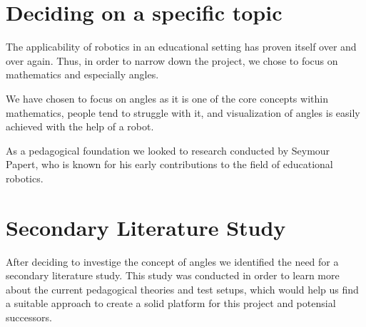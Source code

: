 \section{Deciding on a specific topic}\label{sec:decideTopic}
The applicability of robotics in an educational setting has proven itself over and over again. Thus, in order to narrow down the project, we chose to focus on mathematics and especially angles. 

\bigskip\noindent
We have chosen to focus on angles as it is one of the core concepts within mathematics, people tend to struggle with it, and visualization of angles is easily achieved with the help of a robot. %

\bigskip\noindent
As a pedagogical foundation we looked to research conducted by Seymour Papert, who is known for his early contributions to the field of educational robotics.

\section{Secondary Literature Study}
After deciding to investige the concept of angles we identified the need for a secondary literature study. 
This study was conducted in order to learn more about the current pedagogical theories and test setups, which would help us find a suitable approach to create a solid platform for this project and potensial successors.



